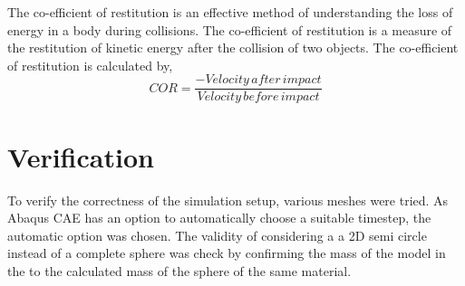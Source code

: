 The co-efficient of restitution is an effective method of understanding the loss of energy in a body during collisions. The co-efficient of restitution is a measure of the restitution of kinetic energy after the collision of two objects. 
The co-efficient of restitution is calculated by,
\begin{equation}
COR = \frac{-Velocity\, after\, impact}{Velocity\, before\, impact}
\end{equation}
\section{Verification}

To verify the correctness of the simulation setup, various meshes were tried. 
As Abaqus CAE has an option to automatically choose a suitable timestep, the automatic option was chosen.
The validity of considering a a 2D semi circle instead of a complete sphere was check by confirming the mass of the model in the to the calculated mass of the sphere of the same material.